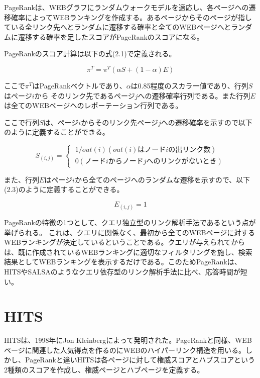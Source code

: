 \documentclass[a4paper,11pt]{jreport}
\begin{document}
PageRankは、WEBグラフにランダムウォークモデルを適応し、各ページヘの遷移確率によってWEBランキングを作成する。あるページからそのページが指している全リンク先へとランダムに遷移する確率と全てのWEBページへとランダムに遷移する確率を足したスコアがPageRankのスコアになる。

PageRankのスコア計算は以下の式(2.1)で定義される。

\begin{equation}
\pi^T = \pi^T(\alpha S + (1 - \alpha)E) 
\end{equation}

ここで$\pi^T$はPageRankベクトルであり、$\alpha$は0.85程度のスカラー値であり、行列$S$はページ$i$から
そのリンク先であるページ$j$への遷移確率行列である。また行列$E$は全てのWEBページヘのレポーテーション行列である。

ここで行列$S$は、ページ$i$からそのリンク先ページ$j$への遷移確率を示すので以下のように定義することができる。

\begin{equation}
S_(i,j) =
\begin{cases}
\; 1/out(i)　(out(i)はノードiの出リンク数) \\
\; 0　(ノードiからノードjへのリンクがないとき)
\end{cases}
\end{equation}

また、行列$E$はページ$i$から全てのページへのランダムな遷移を示すので、以下(2.3)のように定義することができる。

\begin{equation}
E_(i,j) = 1
\end{equation}

PageRankの特徴の1つとして、クエリ独立型のリンク解析手法であるという点が挙げられる。
これは、クエリに関係なく、最初から全てのWEBページに対するWEBランキングが決定しているということである。クエリが与えられてからは、既に作成されているWEBランキングに適切なフィルタリングを施し、検索結果としてWEBランキングを表示するだけである。このためPageRankは、HITSやSALSAのようなクエリ依存型のリンク解析手法に比べ、応答時間が短い。

\section{HITS}

HITSは、1998年にJon Kleinbergによって発明された。PageRankと同様、WEBページに関連した人気得点を作るのにWEBのハイパーリンク構造を用いる。しかし、PageRankと違いHITSは各ページに対して権威スコアとハブスコアという2種類のスコアを作成し、権威ページとハブページを定義する。
\end{document}
